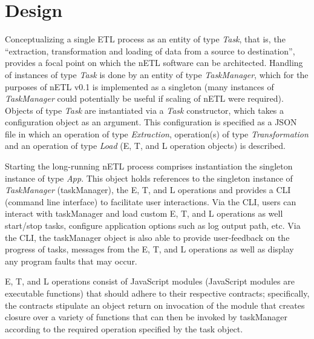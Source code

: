 \section{Design}
Conceptualizing a single ETL process as an entity of type \textit{Task}, that is, the ``extraction, transformation and loading of data from a source to destination'', provides a focal point on which the nETL software can be architected. Handling of instances of type \textit{Task} is done by an entity of type \textit{TaskManager}, which for the purposes of nETL v0.1 is implemented as a singleton (many instances of \textit{TaskManager} could potentially be useful if scaling of nETL were required). Objects of type \textit{Task} are instantiated via a \textit{Task} constructor, which takes a configuration object as an argument. This configuration is specified as a JSON file in which an operation of type \textit{Extraction}, operation(s) of type \textit{Transformation} and an operation of type \textit{Load} (E, T, and L operation objects) is described.

Starting the long-running nETL process comprises instantiation the singleton instance of type \textit{App}. This object holds references to the singleton instance of \textit{TaskManager} (taskManager), the E, T, and L operations and provides a CLI (command line interface) to facilitate user interactions. Via the CLI, users can interact with taskManager and load custom E, T, and L operations as well start/stop tasks, configure application options such as log output path, etc. Via the CLI, the taskManager object is also able to provide user-feedback on the progress of tasks, messages from the E, T, and L operations as well as display any program faults that may occur.

E, T, and L operations consist of JavaScript modules (JavaScript modules are executable functions) that should adhere to their respective contracts; specifically, the contracts stipulate an object return on invocation of the module that creates closure over a variety of functions that can then be invoked by taskManager according to the required operation specified by the task object.

